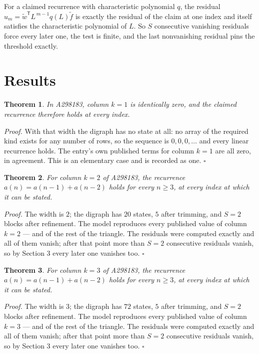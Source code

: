 \documentclass[11pt]{article}
\newtheorem{theorem}{Theorem}
\theoremstyle{definition}
\begin{document}
For a claimed recurrence with characteristic polynomial $q$, the residual $u_m = \tilde w^{\mathsf T}L^{\,m-1}q(L)\tilde f$ is exactly the residual of the claim at one index and itself satisfies the characteristic polynomial of $L$. So $S$ consecutive vanishing residuals force every later one, the test is finite, and the last nonvanishing residual pins the threshold exactly.

\section{Results}

\begin{theorem} In A298183, column $k = 1$ is identically zero, and the claimed recurrence therefore holds at every index.\end{theorem}

{\itshape Proof.} With that width the digraph has no state at all: no array of the required kind exists for any number of rows, so the sequence is $0,0,0,\dots$ and every linear recurrence holds. The entry's own published terms for column $k = 1$ are all zero, in agreement. This is an elementary case and is recorded as one. $\square$

\begin{theorem} For column $k = 2$ of A298183, the recurrence $a(n) = a(n-1) + a(n-2)$ holds for every $n \ge 3$, at every index at which it can be stated.\end{theorem}

{\itshape Proof.} The width is $2$; the digraph has $20$ states, $5$ after trimming, and $S = 2$ blocks after refinement. The model reproduces every published value of column $k = 2$ --- and of the rest of the triangle. The residuals were computed exactly and all of them vanish; after that point more than $S = 2$ consecutive residuals vanish, so by Section 3 every later one vanishes too. $\square$

\begin{theorem} For column $k = 3$ of A298183, the recurrence $a(n) = a(n-1) + a(n-2)$ holds for every $n \ge 3$, at every index at which it can be stated.\end{theorem}

{\itshape Proof.} The width is $3$; the digraph has $72$ states, $5$ after trimming, and $S = 2$ blocks after refinement. The model reproduces every published value of column $k = 3$ --- and of the rest of the triangle. The residuals were computed exactly and all of them vanish; after that point more than $S = 2$ consecutive residuals vanish, so by Section 3 every later one vanishes too. $\square$
\end{document}
